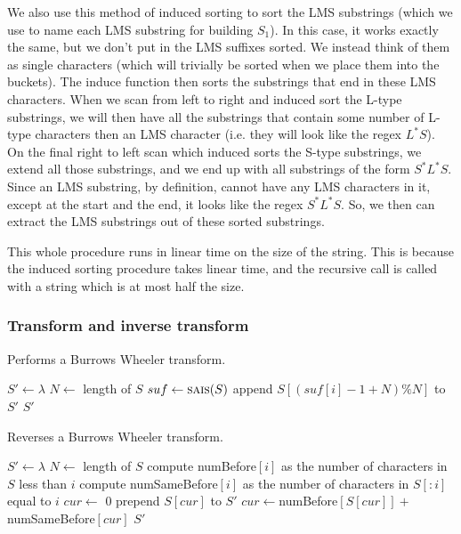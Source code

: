 \documentclass[a4paper]{article}
\begin{document}
\begin{multicols}{2}
We also use this method of induced sorting to sort the LMS substrings (which we use to name each LMS substring for building $S_1$). In this case, it works exactly the same, but we don't put in the LMS suffixes sorted. We instead think of them as single characters (which will trivially be sorted when we place them into the buckets). The induce function then sorts the substrings that end in these LMS characters. When we scan from left to right and induced sort the L-type substrings, we will then have all the substrings that contain some number of L-type characters then an LMS character (i.e. they will look like the regex $L^*S$). On the final right to left scan which induced sorts the S-type substrings, we extend all those substrings, and we end up with all substrings of the form $S^*L^*S$. Since an LMS substring, by definition, cannot have any LMS characters in it, except at the start and the end, it looks like the regex $S^*L^*S$. So, we then can extract the LMS substrings out of these sorted substrings.

This whole procedure runs in linear time on the size of the string. This is because the induced sorting procedure takes linear time, and the recursive call is called with a string which is at most half the size. 
\subsubsection{Transform and inverse transform}
\begin{algorithm}[H]
\caption{Performs a Burrows Wheeler transform.}
\begin{algorithmic}[1]
\State $S' \gets \lambda$
\State $N \gets $ length of $S$
\State $suf \gets \Call{sais}{S}$
\For{$i \gets [0, N)$}
\State append $S[(suf[i]-1+N)\% N]$ to $S'$
\EndFor
\State \Return $S'$
\EndFunction
\end{algorithmic}
\end{algorithm}
\begin{algorithm}[H]
\caption{Reverses a Burrows Wheeler transform.}
\begin{algorithmic}[1]
\State $S' \gets \lambda$
\State $N \gets $ length of $S$
\State compute numBefore$[i]$ as the number of characters in $S$ less than $i$
\State compute numSameBefore$[i]$ as the number of characters in $S[:i]$ equal to $i$
\State $cur \gets$ 0
\For{$i \gets [0, N)$}
\State prepend $S[cur]$ to $S'$
\State $cur \gets $numBefore$[S[cur]] + $numSameBefore$[cur]$
\EndFor
\State \Return $S'$
\EndFunction
\end{algorithmic}
\end{algorithm}

\end{multicols}
\end{document}
